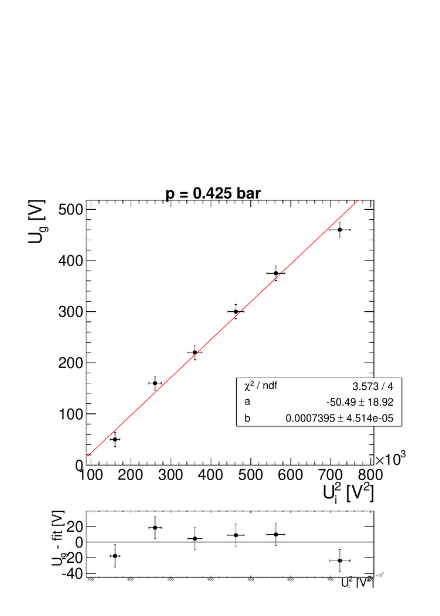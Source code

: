 \documentclass[a4paper,12pt]{article}
\begin{document}
\begin{figure}[htb]
		\includegraphics[height = 0.3\textheight]{linReg425bar2.pdf}\\

\end{figure}
\end{document}
